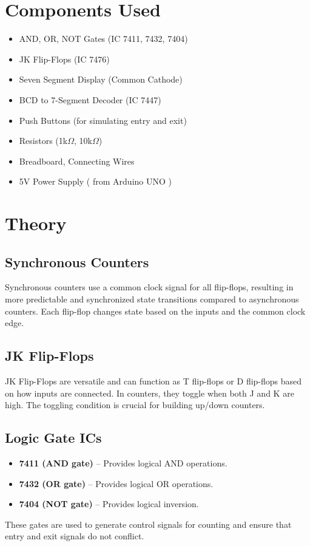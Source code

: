 \documentclass[a4paper,12pt]{article}
\begin{document}
\section{Components Used}
\begin{itemize}
    \item AND, OR, NOT Gates (IC 7411, 7432, 7404)
    \item JK Flip-Flops (IC 7476)
    \item Seven Segment Display (Common Cathode)
    \item BCD to 7-Segment Decoder (IC 7447)
    \item Push Buttons (for simulating entry and exit)
    \item Resistors (1k$\Omega$, 10k$\Omega$)
    \item Breadboard, Connecting Wires
    \item 5V Power Supply ( from Arduino UNO )
\end{itemize}

\section{Theory}

\subsection{Synchronous Counters}
Synchronous counters use a common clock signal for all flip-flops, resulting in more predictable and synchronized state transitions compared to asynchronous counters. Each flip-flop changes state based on the inputs and the common clock edge.

\subsection{JK Flip-Flops}
JK Flip-Flops are versatile and can function as T flip-flops or D flip-flops based on how inputs are connected. In counters, they toggle when both J and K are high. The toggling condition is crucial for building up/down counters.

\subsection{Logic Gate ICs}
\begin{itemize}
    \item \textbf{7411 (AND gate)} – Provides logical AND operations.
    \item \textbf{7432 (OR gate)} – Provides logical OR operations.
    \item \textbf{7404 (NOT gate)} – Provides logical inversion.
\end{itemize}
These gates are used to generate control signals for counting and ensure that entry and exit signals do not conflict.
\end{document}
